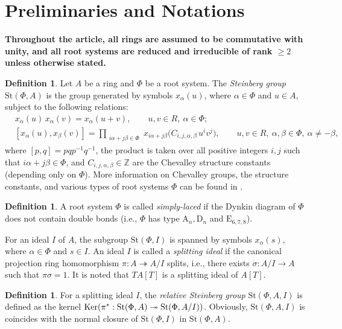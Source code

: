 \documentclass[11pt]{amsart}
\theoremstyle{definition}
\newtheorem{defn}[thm]{Definition}
\numberwithin{equation}{section}
\numberwithin{equation}{section}
\newcommand{\A}{\mathrm{A}}
\newcommand{\D}{\mathrm{D}}
\newcommand{\E}{\mathrm{E}}
\newcommand{\Ker}{{\rm Ker}}
\newcommand{\<}{\langle}
\renewcommand{\>}{\rangle}
\newcommand{\St}{\mathrm{St}}
\begin{document}
\section{Preliminaries and Notations}\label{sec_preli}
{\bf Throughout the article, all rings are assumed to be commutative with unity, and all root systems are reduced and irreducible of rank $\geq 2$ unless otherwise stated.} 
\begin{defn}\label{def_st_grp}
Let $A$ be a ring and $\Phi$ be a root system. The {\it Steinberg group} $\St(\Phi, A)$ is the group generated by symbols $x_\alpha(u)$, where $\alpha \in \Phi$ and $u \in A$, subject to the following relations:
\begin{align}
    &    x_\alpha(u) \, x_\alpha(v) = x_\alpha(u+v), \qquad u, v \in R,~ \alpha\in\Phi;\tag{St1} \label{St1}\\[4pt]
    &    [x_\alpha(u), x_\beta(v)] = \prod_{\substack{i\alpha + j\beta \in \Phi}} x_{i\alpha + j\beta}\bigl(C_{i,j,\alpha,\beta}\, u^i v^j\bigr), \qquad u, v \in R,~\alpha, \beta \in \Phi, ~\alpha\neq -\beta,\tag{St2} \label{St2}
\end{align}
where $[p,q] = pqp^{-1}q^{-1}$, the product is taken over all positive integers $i,j$ such that $i\alpha + j\beta \in \Phi$, and $C_{i,j,\alpha,\beta} \in \mathbb{Z}$ are the Chevalley structure constants (depending only on $\Phi$). More information on Chevalley groups, the structure constants, and various types of root systems $\Phi$ can be found in \cite{St68,VaPl96}. 
\end{defn}
\begin{defn}
    A root system $\Phi$ is called {\it simply-laced} if the Dynkin diagram of $\Phi$ does not contain double bonds (i.e., $\Phi$ has type $\A_n,\D_n$ and $\E_{6,7,8}$). 
\end{defn}
For an ideal $I$ of $A$, the subgroup $\St(\Phi,I)$ is spanned by symbols $x_\alpha(s)$, where $\alpha \in \Phi$ and $s \in I$. An ideal $I$ is called a {\it splitting ideal} if the canonical projection ring homomorphism $\pi:A \twoheadrightarrow A/I$ splits, i.e., there exists $\sigma:A/I\to A$ such that $\pi\sigma=1$. It is noted that $TA[T]$ is a splitting ideal of $A[T]$.
\begin{defn}
  For a splitting ideal $I$, the {\it relative Steinberg group} $\St(\Phi,A,I)$ is defined as the kernel  $\Ker(\pi^{\ast}:\St(\Phi,A)\twoheadrightarrow\St(\Phi,A/I))$. Obviously, $\St(\Phi,A,I)$ is coincides with the normal closure of $\St(\Phi,I)$ in $\St(\Phi,A)$.  
\end{defn}
\end{document}
